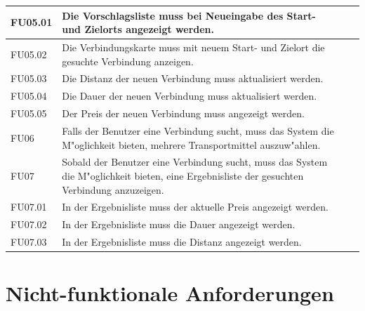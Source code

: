 \documentclass[a4paper, 11pt]{scrreprt}
\begin{document}
\begin{table}[H]
\begin{tabular}{|p{2.5cm} p{12cm}| ll}
\hline
FU05.01	&Die Vorschlagsliste muss bei Neueingabe des Start- und Zielorts angezeigt werden.\\

\hline
FU05.02	&Die Verbindungskarte muss mit neuem Start- und Zielort die gesuchte Verbindung anzeigen.\\

\hline
FU05.03	&Die Distanz der neuen Verbindung muss aktualisiert werden.\\

\hline
FU05.04&	Die Dauer der neuen Verbindung muss aktualisiert werden.\\

\hline
FU05.05	&Der Preis der neuen Verbindung muss angezeigt werden.\\

\hline
FU06	&Falls der Benutzer eine Verbindung sucht, muss das System die M"oglichkeit bieten, mehrere Transportmittel auszuw"ahlen.\\

\hline
FU07	&Sobald der Benutzer eine Verbindung sucht, muss das System die M"oglichkeit bieten, eine Ergebnisliste der gesuchten Verbindung anzuzeigen.\\

\hline
FU07.01&	In der Ergebnisliste muss der aktuelle Preis angezeigt werden.\\

\hline
FU07.02 &	In der Ergebnisliste muss die Dauer angezeigt werden.\\

\hline
FU07.03&	In der Ergebnisliste muss die Distanz angezeigt werden.\\

\hline


\end{tabular}

\end{table}

\section{Nicht-funktionale Anforderungen}
\end{document}
